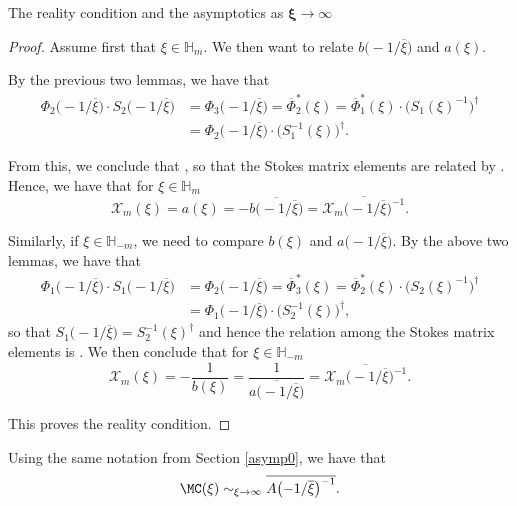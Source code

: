 \begin{subsubsection}{The reality condition and the asymptotics as $\boldsymbol{\xi \to \infty}$}
\begin{proof}
Assume first that $\xi \in \mathbb{H}_m$. We then want to relate $b\bigl(-1/\overline{\xi}\bigr)$ and $a(\xi)$.

By the previous two lemmas, we have that
\begin{align*}
\Phi_2\bigl(-1/\overline{\xi}\bigr)\cdot S_2\bigl(-1/\overline{\xi}\bigr)&=\Phi_3\bigl(-1/\overline{\xi}\bigr)=\overline{\Phi}^*_2(\xi)=\overline{\Phi}^*_1(\xi)\cdot \bigl(S_1(\xi)^{-1}\bigr)^{\dagger}\\
&=\Phi_2\bigl(-1/\overline{\xi}\bigr)\cdot\bigl(S_1^{-1}(\xi)\bigr)^{\dagger}.
\end{align*}

From this, we conclude that , so that the Stokes matrix elements are related by . Hence, we have that for $\xi \in \mathbb{H}_{m}$
\begin{equation*}
 \mathcal{X}_m(\xi)=a(\xi)=-\overline{b\bigl(-1/\overline{\xi}\bigr)}=\overline{\mathcal{X}_m\bigl(-1/\overline{\xi}\bigr)^{-1}}.
\end{equation*}

Similarly, if $\xi \in \mathbb{H}_{-m}$, we need to compare $b(\xi)$ and $a\bigl(-1/\overline{\xi}\bigr)$. By the above two lemmas, we have that
\begin{align*}
 \Phi_1\bigl(-1/\overline{\xi}\bigr)\cdot S_1\bigl(-1/\overline{\xi}\bigr)&=\Phi_2\bigl(-1/\overline{\xi}\bigr)=\overline{\Phi}^*_3(\xi)=\overline{\Phi}^*_2(\xi)\cdot \bigl(S_2(\xi)^{-1}\bigr)^{\dagger}\\
 &=\Phi_1\bigl(-1/\overline{\xi}\bigr)\cdot\bigl(S_2^{-1}(\xi)\bigr)^{\dagger},
\end{align*}
so that $S_1\bigl(-1/\overline{\xi}\bigr)=S_2^{-1}(\xi)^{\dagger}$ and hence the relation among the Stokes matrix elements is . We then conclude that for $\xi \in \mathbb{H}_{-m}$
\begin{equation*}
 \mathcal{X}_m(\xi)=-\frac{1}{b(\xi)}=\frac{1}{\overline{a\bigl(-1/\overline{\xi}\bigr)}}=\overline{\mathcal{X}_m\bigl(-1/\overline{\xi}\bigr)^{-1}}.
\end{equation*}

This proves the reality condition.
\end{proof}

\begin{Corollary} \label{rcc}Using the same notation from Section {\rm\ref{asymp0}}, we have that
\begin{equation*}
 \MC(\xi)\sim_{\xi \to \infty} \overline{A\bigl(-1/\overline{\xi}\bigr)^{-1}}.
\end{equation*}


\end{Corollary}
\end{subsubsection}
